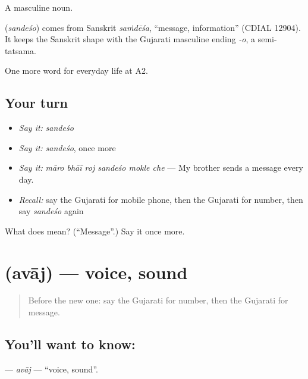 A masculine noun.

\begin{cousinweb}
\textbf{} (\emph{sandeśo}) comes from Sanskrit \emph{saṁdēśa}, \textquotedblleft{}message, information\textquotedblright{} (CDIAL 12904). It keeps the Sanskrit shape with the Gujarati masculine ending \emph{-o}, a semi-tatsama.
\end{cousinweb}

\begin{grammarlens}[title={What you've built}]
One more word for everyday life at A2.
\end{grammarlens}

\subsection*{Your turn}
\begin{itemize}
\raggedright
  \item \emph{Say it:} \emph{sandeśo}
  \item \emph{Say it:} \emph{sandeśo}, once more
  \item \emph{Say it:} \emph{māro bhāī roj sandeśo mokle che} — My brother sends a message every day.
  \item \emph{Recall:} say the Gujarati for mobile phone, then the Gujarati for number, then say \emph{sandeśo} again
\end{itemize}

\begin{tcolorbox}[breakable,colback=teal!4,colframe=teal!35!black,title={Before you move on}]
What does  mean? (\textquotedblleft{}Message\textquotedblright{}.) Say it once more.
\end{tcolorbox}
\section[\texorpdfstring{\gu{અવાજ} (avāj)}{અવાજ (avāj)}]{ (avāj) — voice, sound}

\label{lesson:GU-C249-avaj}



\begin{quote}
Before the new one: say the Gujarati for number, then the Gujarati for message.
\end{quote}

\subsection*{You'll want to know: }
\textbf{} — \emph{avāj} — \textquotedblleft{}voice, sound\textquotedblright{}.

